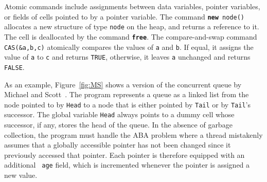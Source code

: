Atomic commands include assignments between data variables, 
pointer variables, or fields of cells pointed to by a pointer variable.
The command {\tt {\bf new} node()} allocates a new structure of type
{\tt node} on the heap, and returns a
reference to it. The cell is deallocated by the command {\tt \bf free}.
The compare-and-swap command {\tt CAS(\&a,b,c)} atomically
compares the values of {\tt a} and {\tt b}.
If  equal, it assigns the value of
{\tt a} to {\tt c}  and returns {\tt TRUE}, 
otherwise, it leaves {\tt a} unchanged and returns {\tt FALSE}. 


As an example, Figure~\ref{fig:MS} shows %
%
%
a version of the concurrent queue by Michael and
Scott~\cite{MS:QueueAlgorithms}.
The program represents a queue as a linked list from the node
pointed to by {\tt Head} to a node that is either pointed by {\tt Tail} or by {\tt Tail}'s successor. 
%
The global variable {\tt Head} always points to a dummy cell whose successor, if any, stores the head of the queue. 
%
In the absence of garbage collection, the program must handle the ABA
problem where a thread mistakenly assumes that a globally accessible
pointer has not been changed since it previously accessed that
pointer. Each pointer is therefore equipped with an additional {\tt
  age} field, which is incremented whenever the pointer is assigned a
new value.


